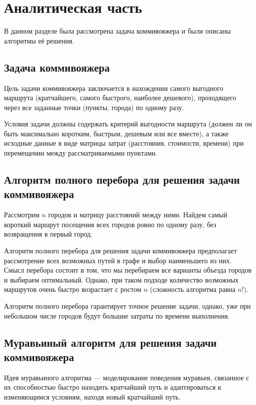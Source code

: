 \chapter{Аналитическая часть}
В данном разделе была рассмотрена задача коммивояжера и были описаны алгоритмы её решения.

\section{Задача коммивояжера}

Цель задачи коммивояжера \cite{model} заключается в нахождении самого выгодного маршрута (кратчайшего, самого быстрого, наиболее дешевого), проходящего через все заданные точки (пункты, города) по одному разу.

Условия задачи должны содержать критерий выгодности маршрута (должен ли он быть максимально коротким, быстрым, дешевым или все вместе), а также исходные данные в виде матрицы затрат (расстояния, стоимости, времени) при перемещении между рассматриваемыми пунктами.

\section{Алгоритм полного перебора для решения задачи коммивояжера}

Рассмотрим $n$ городов и матрицу расстояний между ними. Найдем самый короткий маршрут посещения всех городов ровно по одному разу, без возвращения в первый город.

Алгоритм полного перебора для решения задачи коммивояжера предполагает рассмотрение всех возможных путей в графе и выбор наименьшего из них. Смысл перебора состоит в том, что мы перебираем все варианты объезда городов и выбираем оптимальный. Однако, при таком подходе количество возможных маршрутов очень быстро возрастает с ростом $n$ (сложность алгоритма равна $n!$).

Алгоритм полного перебора гарантирует точное решение задачи, однако, уже при небольшом числе городов будут большие затраты по времени выполнения.

\section{Муравьиный алгоритм для решения задачи коммивояжера}

Идея муравьиного алгоритма \cite{ant} — моделирование поведения муравьев, связанное с их способностью быстро находить кратчайший путь и адаптироваться к изменяющимся условиям, находя новый кратчайший путь.

